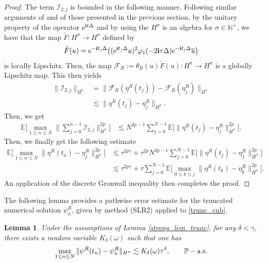 \documentclass[a4paper]{amsart}
\newtheorem{lemma}[theorem]{Lemma}
\begin{document}
\begin{proof}
    The term $\mathcal{I}_{2,j}$ is bounded in the following manner. Following similar arguments of \cite{fe_ka,os_ka} and of those presented in the previous section, by the unitary property of the operator ${\rm e}^{{\bf i}t\Delta}$ and by using the $H^\sigma$ is an algebra for $\sigma\in\mathbb{N}^+$, we have that the map
    $\tilde{F}:H^\sigma\to H^\sigma$ defined by
    $$
    \tilde{F}(u)={\rm e}^{-{\bf i}t_j\Delta}\big(({\rm e}^{{\bf i}t_j\Delta} u)^2 \varphi_1(-2{\bf i}\tau\Delta){\rm e}^{-{\bf i}t_j\Delta} \overline{u}\big)
    $$
    is locally Lipschitz. Then, the map $\mathcal{F}_R:=\theta_R(u)\tilde{F}(u):H^\sigma\to H^\sigma$ is a globally Lipschitz map. This then yields
    \begin{align*}
    \|\mathcal{I}_{2,j}\|_{H^\sigma} &= \|\mathcal{F}_R(\eta^R(t_j))-\mathcal{F}_R(\eta^R_j)\|_{H^\sigma}\\
    &\lesssim \|\eta^R(t_j)-\eta^R_j\|_{H^\sigma}.
    \end{align*}
    Then, we get
        \begin{align*}
            \mathbb{E}\big[\max_{1\le n\le N}\|\sum_{j=0}^{n-1}\mathcal{I}_{2,j}\|^{2p}_{H^\sigma}\big]&\lesssim N^{2p-1}\sum_{j=0}^{N-1}\mathbb{E}\big[\|\eta^R(t_j)-\eta^R_j\|^{2p}_{H^\sigma}\big].
        \end{align*}
    Then, we finally get the following estimate
    \begin{align*}
    \mathbb{E}\big[\max_{1\le n\le N}\|\eta^R(t_n)-\eta_j^R\|^{2p}_{H^\sigma}\big]&\lesssim \tau^{2p\gamma}+\tau^{2p}N^{2p-1}\sum_{j=0}^{N-1}\mathbb{E}\big[\|\eta^R(t_j)-\eta^R_j\|^{2p}_{H^\sigma}\big]\\
    &\lesssim \tau^{2p\gamma}+\tau \sum_{j=0}^{N-1}\mathbb{E}\big[\max_{0\le k\le j} \|\eta^R(t_k)-\eta^R_k\|^{2p}_{H^\sigma}\big].
     \end{align*}
    An application of the discrete Gronwall inequality then completes the proof.
\end{proof}

 The following lemma provides a pathwise error estimate for the truncated numerical solution $\psi^R_n$, given by method (SLR2) applied to \eqref{trunc_cub}.
    \begin{lemma}
    \label{path_trunc_lem}
        Under the assumptions of Lemma \ref{strong_lem_trunc}, for any $\delta<\gamma$, there exists a random variable $K_\delta(\omega)$ such that one has
        $$
        \max_{1\le n\le N} \|\psi^R(t_n)-\psi^R_n\|_{H^\sigma}\lesssim K_\delta(\omega) \tau^{\delta},\qquad \mathbb{P}-{\rm a.s.}
        $$
    \end{lemma}
\end{document}
